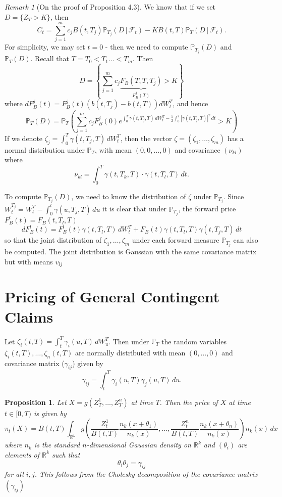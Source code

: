 \documentclass[10pt, oneside, reqno]{amsbook}
\theoremstyle{plain}%
\newtheorem{prop}[thm]{Proposition}
\theoremstyle{definition}
\theoremstyle{remark}
\newtheorem*{rem}{Remark}
\newcommand{\given}{ \, | \,}
\newcommand{\sigf}{\mathcal{F}}
\newcommand{\R}{\mathbb{R}}
\renewcommand{\P}{\mathbb{P}}
\numberwithin{equation}{chapter}
\begin{document}
\begin{rem}[On the proof of Proposition 4.3]
	We know that if we set $D = \{ Z_T > K \}$, then \[
		C_t = \sum_{j=1}^m c_j B(t, T_j) \P_{T_j}(D \given \sigf_t) - K B(t, T) \P_T(D \given \sigf_t).
	\]
	For simplicity, we may set $t = 0$ - then we need to compute $\P_{T_j}(D)$ and $\P_T(D)$.  Recall that $T = T_0 < T_1 \dots < T_m$.  Then \[
		D = \left\{ \sum_{j=1}^m c_j \underbrace{F_B(T, T, T_j)}_{F^j_B(T)} > K \right\}
	\]       where $dF^j_B(t) = F^j_B(t)(b(t, T_j) - b(t, T)) dW^T_t$, and hence \[
		\P_T(D) = \P_T \left( \sum_{j=1}^m c_j F^j_B(0) e^{\int_0^T \gamma(t, T_j, T) \, dW^T_t - \frac{1}{2} \int_0^T \left| \gamma(t, T_j, T) \right|^2 \, dt} > K \right)
 	\]
If we denote $\zeta_j = \int_0^T \gamma(t, T_j, T) \, dW^T_t$, then the vector $\zeta = (\zeta_1, \dots, \zeta_m)$ has a normal distribution under $\P_T$, with mean $(0, 0, \dots, 0)$ and covariance $(\nu_{kl})$ where \[
	\nu_{kl} = \int_0^T \gamma(t, T_k, T) \cdot \gamma(t, T_l, T) \, dt.
\]

To compute $\P_{T_j}(D)$, we need to know the distribution of $\zeta$ under $\P_{T_j}$.  Since $W^{T_j}_t = W^T_t - \int_0^t \gamma(u, T_j, T) \, du$ it is clear that under $\P_{T_j}$, the forward price $F^l_B(t) = F_B(t, T_l, T)$ \[
	dF^l_B(t) = F^l_B(t) \gamma(t, T_l, T) \, dW^T_t + F_B(t) \gamma(t, T_l, T) \gamma(t, T_j, T) \, dt
\] so that the joint distribution of $\zeta_1, \dots, \zeta_m$ under each forward measure $\P_{T_j}$ can also be computed.  The joint distribution is Gaussian with the same covariance matrix but with means $v_{lj}$

\end{rem}

\section{Pricing of General Contingent Claims} %
\label{sec:pricing_of_general_contingent_claims}
Let $\zeta_i(t, T) = \int_t^T \gamma_i(u, T) \, dW^T_u$.  Then under $\P_T$ the random variables $\zeta_i(t, T), \dots, \zeta_n(t, T)$ are normally distributed with mean $(0, \dots, 0)$ and covariance matrix ($\gamma_{ij}$) given by \[
	\gamma_{ij} = \int_t^T \gamma_i(u, T) \gamma_j(u, T) \, du.
\]

\begin{prop}
	Let $X = g(Z^1_T, \dots, Z^n_T)$ at time $T$.  Then the price of $X$ at time $t \in [0, T)$ is given by \[
		\pi_t(X) = B(t, T) \int_{\R^k} g\left( \frac{Z^1_t}{B(t, T)} \frac{n_k(x+ \theta_1)}{n_k(x)}, \dots, \frac{Z^n_t}{B(t, T)} \frac{n_k(x+\theta_n)}{n_k(x)}\right) n_k(x) \, dx
	\] where $n_k$ is the standard $n$-dimensional Gaussian density on $\R^k$ and $(\theta_i)$ are elements of $\R^k$ such that \[
		\theta_i \theta_j = \gamma_{ij}
	\] for all $i, j$.   This follows from the Cholesky decomposition of the covariance matrix $(\gamma_{ij})$
\end{prop}
\end{document}
